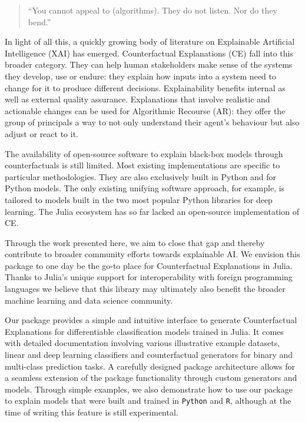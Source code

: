\documentclass{juliacon}
\begin{document}
\begin{quote}
``You cannot appeal to (algorithms). They do not listen. Nor do they
bend.'' \cite{oneil2016weapons}
\end{quote}

In light of all this, a quickly growing body of literature on
Explainable Artificial Intelligence (XAI) has emerged. Counterfactual
Explanations (CE) fall into this broader category. They can help human
stakeholders make sense of the systems they develop, use or endure: they
explain how inputs into a system need to change for it to produce
different decisions. Explainability benefits internal as well as
external quality assurance. Explanations that involve realistic and
actionable changes can be used for Algorithmic Recourse (AR): they offer
the group of principals a way to not only understand their agent's
behaviour but also adjust or react to it.

The availability of open-source software to explain black-box models
through counterfactuals is still limited. Most existing implementations
are specific to particular methodologies. They are also exclusively
built in Python and for Python models. The only existing unifying
software approach, for example, is tailored to models built in the two
most popular Python libraries for deep learning. The Julia ecosystem has
so far lacked an open-source implementation of CE.

Through the work presented here, we aim to close that gap and thereby
contribute to broader community efforts towards explainable AI. We
envision this package to one day be the go-to place for Counterfactual
Explanations in Julia. Thanks to Julia's unique support for
interoperability with foreign programming languages we believe that this
library may ultimately also benefit the broader machine learning and
data science community.

Our package provides a simple and intuitive interface to generate
Counterfactual Explanations for differentiable classification models
trained in Julia. It comes with detailed documentation involving various
illustrative example datasets, linear and deep learning classifiers and
counterfactual generators for binary and multi-class prediction tasks. A
carefully designed package architecture allows for a seamless extension
of the package functionality through custom generators and models.
Through simple examples, we also demonstrate how to use our package to
explain models that were built and trained in \texttt{Python} and
\texttt{R}, although at the time of writing this feature is still
experimental.
\end{document}
